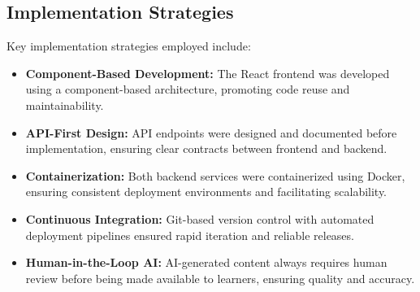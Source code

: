 \FloatBarrier

\subsection{Implementation Strategies}

Key implementation strategies employed include:

\begin{itemize}
    \item \textbf{Component-Based Development:} The React frontend was developed using a component-based architecture, promoting code reuse and maintainability.
    
    \item \textbf{API-First Design:} API endpoints were designed and documented before implementation, ensuring clear contracts between frontend and backend.
    
    \item \textbf{Containerization:} Both backend services were containerized using Docker, ensuring consistent deployment environments and facilitating scalability.
    
    \item \textbf{Continuous Integration:} Git-based version control with automated deployment pipelines ensured rapid iteration and reliable releases.
    
    \item \textbf{Human-in-the-Loop AI:} AI-generated content always requires human review before being made available to learners, ensuring quality and accuracy.
\end{itemize}



